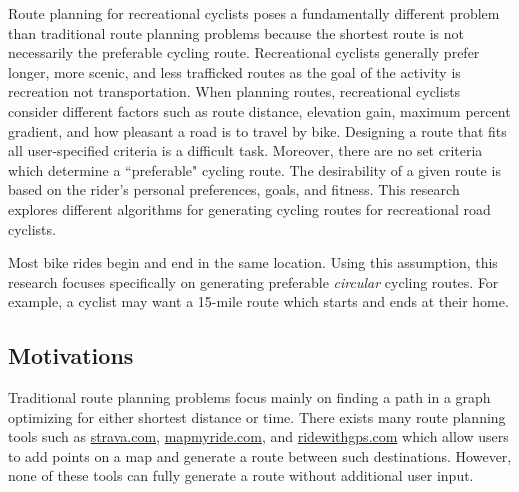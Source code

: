\documentclass[honors]{union-cs-thesis}
\newcommand{\td}{\todo[inline]}
\begin{document}
Route planning for recreational cyclists poses a fundamentally different problem than traditional route planning problems because the shortest route is not necessarily the 	preferable cycling route. Recreational cyclists generally prefer longer, more scenic, and less trafficked routes as the goal of the activity is recreation not transportation. When planning routes, recreational cyclists consider different factors such as route distance, elevation gain, maximum percent gradient, and how pleasant a road is to travel by bike. Designing a route that fits all user-specified criteria is a difficult task.  Moreover, there are no set criteria which determine a ``preferable" cycling route. The desirability of a given route is based on the rider's personal preferences, goals, and fitness. This research explores different algorithms for generating cycling routes for recreational road cyclists.


Most bike rides begin and end in the same location. Using this assumption, this research focuses specifically on generating preferable \emph{circular} cycling routes. For example, a cyclist may want a 15-mile route which starts and ends at their home.
    

\subsection{Motivations}
Traditional route planning problems focus mainly on finding a path in a graph optimizing for either shortest distance or time. There exists many route planning tools such as \href{https://www.strava.com/routes/new}{\url{strava.com}}, \href{https://www.mapmyride.com}{\url{mapmyride.com}}, and \href{https://ridewithgps.com}{\url{ridewithgps.com}} which allow users to add points on a map and generate a route between such destinations. However, none of these tools can fully generate a route without additional user input.

\end{document}
